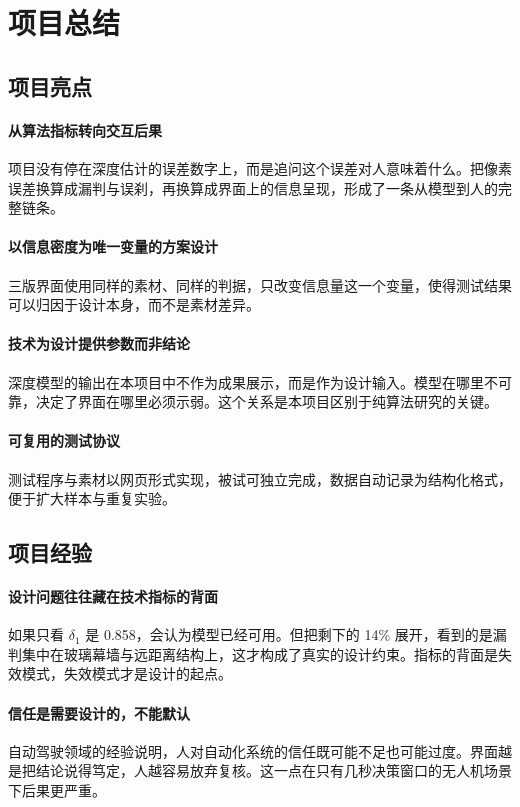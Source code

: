 \documentclass[12pt,a4paper]{ctexart}
\begin{document}
\section{项目总结}

\subsection{项目亮点}

\paragraph{从算法指标转向交互后果}
项目没有停在深度估计的误差数字上，而是追问这个误差对人意味着什么。把像素误差换算成漏判与误刹，再换算成界面上的信息呈现，形成了一条从模型到人的完整链条。

\paragraph{以信息密度为唯一变量的方案设计}
三版界面使用同样的素材、同样的判据，只改变信息量这一个变量，使得测试结果可以归因于设计本身，而不是素材差异。

\paragraph{技术为设计提供参数而非结论}
深度模型的输出在本项目中不作为成果展示，而是作为设计输入。模型在哪里不可靠，决定了界面在哪里必须示弱。这个关系是本项目区别于纯算法研究的关键。

\paragraph{可复用的测试协议}
测试程序与素材以网页形式实现，被试可独立完成，数据自动记录为结构化格式，便于扩大样本与重复实验。

\subsection{项目经验}

\paragraph{设计问题往往藏在技术指标的背面}
如果只看 $\delta_1$ 是 0.858，会认为模型已经可用。但把剩下的 14\% 展开，看到的是漏判集中在玻璃幕墙与远距离结构上，这才构成了真实的设计约束。指标的背面是失效模式，失效模式才是设计的起点。

\paragraph{信任是需要设计的，不能默认}
自动驾驶领域的经验说明，人对自动化系统的信任既可能不足也可能过度。界面越是把结论说得笃定，人越容易放弃复核。这一点在只有几秒决策窗口的无人机场景下后果更严重。
\end{document}

